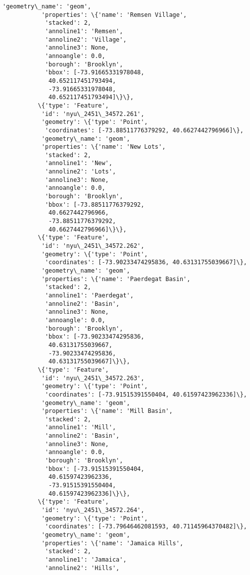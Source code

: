 \documentclass[11pt]{article}
\begin{document}
\begin{Verbatim}[commandchars=\\\{\}]
           'geometry\_name': 'geom',
           'properties': \{'name': 'Remsen Village',
            'stacked': 2,
            'annoline1': 'Remsen',
            'annoline2': 'Village',
            'annoline3': None,
            'annoangle': 0.0,
            'borough': 'Brooklyn',
            'bbox': [-73.91665331978048,
             40.652117451793494,
             -73.91665331978048,
             40.652117451793494]\}\},
          \{'type': 'Feature',
           'id': 'nyu\_2451\_34572.261',
           'geometry': \{'type': 'Point',
            'coordinates': [-73.88511776379292, 40.6627442796966]\},
           'geometry\_name': 'geom',
           'properties': \{'name': 'New Lots',
            'stacked': 2,
            'annoline1': 'New',
            'annoline2': 'Lots',
            'annoline3': None,
            'annoangle': 0.0,
            'borough': 'Brooklyn',
            'bbox': [-73.88511776379292,
             40.6627442796966,
             -73.88511776379292,
             40.6627442796966]\}\},
          \{'type': 'Feature',
           'id': 'nyu\_2451\_34572.262',
           'geometry': \{'type': 'Point',
            'coordinates': [-73.90233474295836, 40.63131755039667]\},
           'geometry\_name': 'geom',
           'properties': \{'name': 'Paerdegat Basin',
            'stacked': 2,
            'annoline1': 'Paerdegat',
            'annoline2': 'Basin',
            'annoline3': None,
            'annoangle': 0.0,
            'borough': 'Brooklyn',
            'bbox': [-73.90233474295836,
             40.63131755039667,
             -73.90233474295836,
             40.63131755039667]\}\},
          \{'type': 'Feature',
           'id': 'nyu\_2451\_34572.263',
           'geometry': \{'type': 'Point',
            'coordinates': [-73.91515391550404, 40.61597423962336]\},
           'geometry\_name': 'geom',
           'properties': \{'name': 'Mill Basin',
            'stacked': 2,
            'annoline1': 'Mill',
            'annoline2': 'Basin',
            'annoline3': None,
            'annoangle': 0.0,
            'borough': 'Brooklyn',
            'bbox': [-73.91515391550404,
             40.61597423962336,
             -73.91515391550404,
             40.61597423962336]\}\},
          \{'type': 'Feature',
           'id': 'nyu\_2451\_34572.264',
           'geometry': \{'type': 'Point',
            'coordinates': [-73.79646462081593, 40.71145964370482]\},
           'geometry\_name': 'geom',
           'properties': \{'name': 'Jamaica Hills',
            'stacked': 2,
            'annoline1': 'Jamaica',
            'annoline2': 'Hills',

\end{Verbatim}
\end{document}
